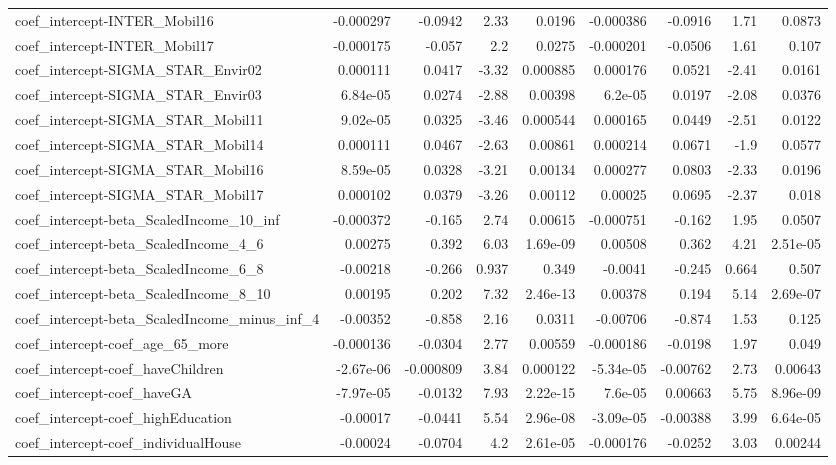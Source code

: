 \begin{tabular}{lrrrrrrrr}
coef_intercept-INTER_Mobil16 & -0.000297 & -0.0942 & 2.33 & 0.0196 & -0.000386 & -0.0916 & 1.71 & 0.0873 \\
coef_intercept-INTER_Mobil17 & -0.000175 & -0.057 & 2.2 & 0.0275 & -0.000201 & -0.0506 & 1.61 & 0.107 \\
coef_intercept-SIGMA_STAR_Envir02 & 0.000111 & 0.0417 & -3.32 & 0.000885 & 0.000176 & 0.0521 & -2.41 & 0.0161 \\
coef_intercept-SIGMA_STAR_Envir03 & 6.84e-05 & 0.0274 & -2.88 & 0.00398 & 6.2e-05 & 0.0197 & -2.08 & 0.0376 \\
coef_intercept-SIGMA_STAR_Mobil11 & 9.02e-05 & 0.0325 & -3.46 & 0.000544 & 0.000165 & 0.0449 & -2.51 & 0.0122 \\
coef_intercept-SIGMA_STAR_Mobil14 & 0.000111 & 0.0467 & -2.63 & 0.00861 & 0.000214 & 0.0671 & -1.9 & 0.0577 \\
coef_intercept-SIGMA_STAR_Mobil16 & 8.59e-05 & 0.0328 & -3.21 & 0.00134 & 0.000277 & 0.0803 & -2.33 & 0.0196 \\
coef_intercept-SIGMA_STAR_Mobil17 & 0.000102 & 0.0379 & -3.26 & 0.00112 & 0.00025 & 0.0695 & -2.37 & 0.018 \\
coef_intercept-beta_ScaledIncome_10_inf & -0.000372 & -0.165 & 2.74 & 0.00615 & -0.000751 & -0.162 & 1.95 & 0.0507 \\
coef_intercept-beta_ScaledIncome_4_6 & 0.00275 & 0.392 & 6.03 & 1.69e-09 & 0.00508 & 0.362 & 4.21 & 2.51e-05 \\
coef_intercept-beta_ScaledIncome_6_8 & -0.00218 & -0.266 & 0.937 & 0.349 & -0.0041 & -0.245 & 0.664 & 0.507 \\
coef_intercept-beta_ScaledIncome_8_10 & 0.00195 & 0.202 & 7.32 & 2.46e-13 & 0.00378 & 0.194 & 5.14 & 2.69e-07 \\
coef_intercept-beta_ScaledIncome_minus_inf_4 & -0.00352 & -0.858 & 2.16 & 0.0311 & -0.00706 & -0.874 & 1.53 & 0.125 \\
coef_intercept-coef_age_65_more & -0.000136 & -0.0304 & 2.77 & 0.00559 & -0.000186 & -0.0198 & 1.97 & 0.049 \\
coef_intercept-coef_haveChildren & -2.67e-06 & -0.000809 & 3.84 & 0.000122 & -5.34e-05 & -0.00762 & 2.73 & 0.00643 \\
coef_intercept-coef_haveGA & -7.97e-05 & -0.0132 & 7.93 & 2.22e-15 & 7.6e-05 & 0.00663 & 5.75 & 8.96e-09 \\
coef_intercept-coef_highEducation & -0.00017 & -0.0441 & 5.54 & 2.96e-08 & -3.09e-05 & -0.00388 & 3.99 & 6.64e-05 \\
coef_intercept-coef_individualHouse & -0.00024 & -0.0704 & 4.2 & 2.61e-05 & -0.000176 & -0.0252 & 3.03 & 0.00244 \\

\end{tabular}
